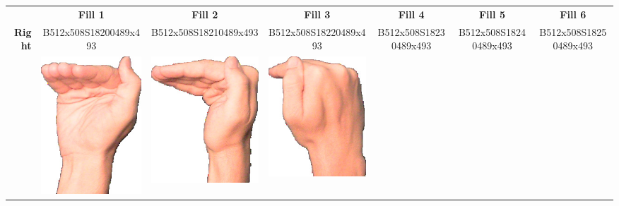 \documentclass{article}
\begin{document}
\begin{center}
\begin{tabular}{r*{6}{c}}
&\textbf{Fill 1}&\textbf{Fill 2}&\textbf{Fill 3}&\textbf{Fill 4}&\textbf{Fill 5}&\textbf{Fill 6}\\
\multirow{2}{*}{\textbf{Right}}&
B512x508S18200489x493&
B512x508S18210489x493&
B512x508S18220489x493&
B512x508S18230489x493&
B512x508S18240489x493&
B512x508S18250489x493\\
&
\includegraphics[scale=0.1]{images/05-20-1.jpg}&
\includegraphics[scale=0.1]{images/05-20-2.jpg}&
\includegraphics[scale=0.1]{images/05-20-3.jpg}&

\end{tabular}
\end{center}
\end{document}
